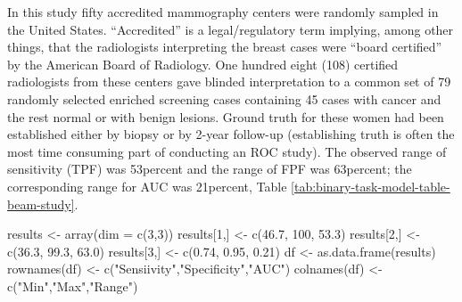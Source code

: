 \documentclass[
]{book}
\newenvironment{Shaded}{\begin{snugshade}}{\end{snugshade}}
\newcommand{\AttributeTok}[1]{\textcolor[rgb]{0.77,0.63,0.00}{#1}}
\newcommand{\DecValTok}[1]{\textcolor[rgb]{0.00,0.00,0.81}{#1}}
\newcommand{\FloatTok}[1]{\textcolor[rgb]{0.00,0.00,0.81}{#1}}
\newcommand{\FunctionTok}[1]{\textcolor[rgb]{0.00,0.00,0.00}{#1}}
\newcommand{\NormalTok}[1]{#1}
\newcommand{\OtherTok}[1]{\textcolor[rgb]{0.56,0.35,0.01}{#1}}
\newcommand{\StringTok}[1]{\textcolor[rgb]{0.31,0.60,0.02}{#1}}
\begin{document}
In this study \citep{RN1087} fifty accredited mammography centers were randomly sampled in the United States. ``Accredited'' is a legal/regulatory term implying, among other things, that the radiologists interpreting the breast cases were ``board certified'' by the American Board of Radiology. One hundred eight (108) certified radiologists from these centers gave blinded interpretation to a common set of 79 randomly selected enriched screening cases containing 45 cases with cancer and the rest normal or with benign lesions. Ground truth for these women had been established either by biopsy or by 2-year follow-up (establishing truth is often the most time consuming part of conducting an ROC study). The observed range of sensitivity (TPF) was 53percent and the range of FPF was 63percent; the corresponding range for AUC was 21percent, Table \ref{tab:binary-task-model-table-beam-study}.

\begin{Shaded}
\begin{Highlighting}[]
\NormalTok{results }\OtherTok{\textless{}{-}} \FunctionTok{array}\NormalTok{(}\AttributeTok{dim =} \FunctionTok{c}\NormalTok{(}\DecValTok{3}\NormalTok{,}\DecValTok{3}\NormalTok{))}
\NormalTok{results[}\DecValTok{1}\NormalTok{,] }\OtherTok{\textless{}{-}} \FunctionTok{c}\NormalTok{(}\FloatTok{46.7}\NormalTok{, }\DecValTok{100}\NormalTok{, }\FloatTok{53.3}\NormalTok{)}
\NormalTok{results[}\DecValTok{2}\NormalTok{,] }\OtherTok{\textless{}{-}} \FunctionTok{c}\NormalTok{(}\FloatTok{36.3}\NormalTok{, }\FloatTok{99.3}\NormalTok{, }\FloatTok{63.0}\NormalTok{)}
\NormalTok{results[}\DecValTok{3}\NormalTok{,] }\OtherTok{\textless{}{-}} \FunctionTok{c}\NormalTok{(}\FloatTok{0.74}\NormalTok{, }\FloatTok{0.95}\NormalTok{, }\FloatTok{0.21}\NormalTok{)}
\NormalTok{df }\OtherTok{\textless{}{-}} \FunctionTok{as.data.frame}\NormalTok{(results)}
\FunctionTok{rownames}\NormalTok{(df) }\OtherTok{\textless{}{-}} \FunctionTok{c}\NormalTok{(}\StringTok{"Sensiivity"}\NormalTok{,}\StringTok{"Specificity"}\NormalTok{,}\StringTok{"AUC"}\NormalTok{)}
\FunctionTok{colnames}\NormalTok{(df) }\OtherTok{\textless{}{-}} \FunctionTok{c}\NormalTok{(}\StringTok{"Min"}\NormalTok{,}\StringTok{"Max"}\NormalTok{,}\StringTok{"Range"}\NormalTok{)}
\end{Highlighting}
\end{Shaded}
\end{document}

